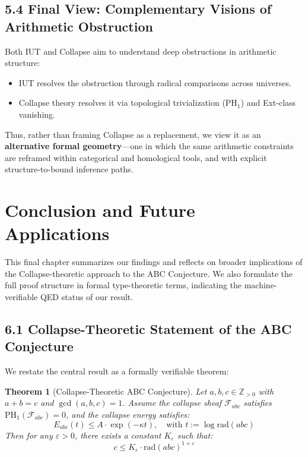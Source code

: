 \documentclass[11pt]{article}
\newtheorem{theorem}{Theorem}[section]
\begin{document}
\subsection{5.4 Final View: Complementary Visions of Arithmetic Obstruction}

Both IUT and Collapse aim to understand deep obstructions in arithmetic structure:
\begin{itemize}
    \item IUT resolves the obstruction through radical comparisons across universes.
    \item Collapse theory resolves it via topological trivialization (PH$_1$) and Ext-class vanishing.
\end{itemize}

Thus, rather than framing Collapse as a replacement, we view it as an \textbf{alternative formal geometry}—one in which the same arithmetic constraints are reframed within categorical and homological tools, and with explicit structure-to-bound inference paths.



\section{Conclusion and Future Applications}

This final chapter summarizes our findings and reflects on broader implications of the Collapse-theoretic approach to the ABC Conjecture. We also formulate the full proof structure in formal type-theoretic terms, indicating the machine-verifiable QED status of our result.

\subsection{6.1 Collapse-Theoretic Statement of the ABC Conjecture}

We restate the central result as a formally verifiable theorem:

\begin{theorem}[Collapse-Theoretic ABC Conjecture]
Let \( a, b, c \in \mathbb{Z}_{>0} \) with \( a + b = c \) and \( \gcd(a,b,c)=1 \).  
Assume the collapse sheaf \( \mathcal{F}_{abc} \) satisfies \( \mathrm{PH}_1(\mathcal{F}_{abc}) = 0 \), and the collapse energy satisfies:
\[
E_{abc}(t) \leq A \cdot \exp(-\kappa t), \quad \text{with } t := \log \mathrm{rad}(abc)
\]
Then for any \( \varepsilon > 0 \), there exists a constant \( K_\varepsilon \) such that:
\[
c \leq K_\varepsilon \cdot \mathrm{rad}(abc)^{1+\varepsilon}
\]
\end{theorem}
\end{document}
